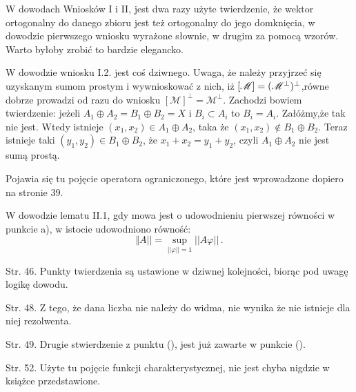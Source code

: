 \documentclass[a4paper,11pt]{article}
\begin{document}
\vspace{\spaceFour}



 W dowodach Wniosków I i II, jest dwa razy użyte
twierdzenie, że wektor ortogonalny do danego zbioru jest też
ortogonalny do jego domknięcia, w dowodzie pierwszego wniosku
wyrażone słownie, w drugim za pomocą wzorów. Warto byłoby zrobić to
bardzie elegancko.

\vspace{\spaceFour}



 W dowodzie wniosku I.2. jest coś dziwnego. Uwaga, że
należy przyjrzeć się uzyskanym sumom prostym i wywnioskować z nich,
iż $[ \mathcal{M} ]=( \mathcal{M}^{ \bot } )^{ \bot }$,równe
dobrze prowadzi od razu do wniosku
$[ \mathcal{ M } ]^{ \bot } = \mathcal{ M }^{ \bot }$. Zachodzi
bowiem twierdzenie: jeżeli
$A_{ 1 } \oplus A_{ 2 } = B_{ 1 } \oplus B_{ 2 } = X$ i
$B_{ i } \subset A_{ i }$ to $B_{ i } = A_{ i }$. Załóżmy,że tak nie
jest. Wtedy istnieje
$( x_{ 1 }, x_{ 2 } ) \in A_{ 1 } \oplus A_{ 2 }$, taka że
$( x_{ 1 }, x_{ 2 } ) \notin B_{ 1 } \oplus B_{ 2 }$. Teraz istnieje
taki $( y_{ 1 }, y_{ 2 } ) \in B_{ 1 } \oplus B_{ 2 }$, że
$x_{ 1 } + x_{ 2 } = y_{ 1 } + y_{ 2 }$, czyli
$A_{ 1 } \oplus A_{ 2 }$ nie jest sumą prostą.

\vspace{\spaceFour}



 Pojawia się tu pojęcie operatora ograniczonego, które
jest wprowadzone dopiero na stronie 39.

\vspace{\spaceFour}



 W dowodzie lematu II.1, gdy mowa jest o udowodnieniu
pierwszej równości w punkcie a), w istocie udowodniono równość:
$$\Vert A || = \sup_{ || \varphi || = 1 } || A \varphi || \, .$$

 Str. 46. Punkty twierdzenia są ustawione w dziwnej kolejności,
  biorąc pod uwagę logikę dowodu.

 Str. 48. Z tego, że dana liczba nie należy do widma, nie wynika
  że nie istnieje dla niej rezolwenta.

 Str. 49. Drugie stwierdzenie z punktu (), jest już
  zawarte w punkcie ().

 Str. 52. Użyte tu pojęcie funkcji charakterystycznej, nie jest
  chyba nigdzie w książce przedstawione.
\end{document}
